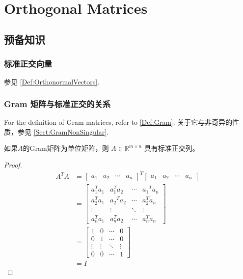 \chapter{Orthogonal Matrices}

\section{预备知识}

\subsection{标准正交向量}

参见 \ref{Def:OrthonormalVectors}.

\subsection{Gram 矩阵与标准正交的关系}

For the definition of Gram matrices, refer to \ref{Def:Gram}. 关于它与非奇异的性质，参见 \ref{Sect:GramNonSingular}.

\begin{theorem}
    如果$A$的Gram矩阵为单位矩阵，则 $ A \in \mathbb{R}^{m \times n} $ 具有标准正交列。
\end{theorem}

\begin{proof}
    \begin{equation} \begin{aligned} A^{T} A&=\left[\begin{array}{llll}a_{1} & a_{2} & \cdots & a_{n}\end{array}\right]^{T}\left[\begin{array}{llll}a_{1} & a_{2} & \cdots & a_{n}\end{array}\right] 
    \\ &=\left[\begin{array}{cccc}a_{1}^{T} a_{1} & a_{1}^{T} a_{2} & \cdots & a_{1}{ }^{T} a_{n} \\ a_{2}^{T} a_{1} & a_{2}{ }^{T} a_{2} & \cdots & a_{2}^{T} a_{n} \\ \vdots & \vdots & \ddots & \vdots \\ a_{n}^{T} a_{1} & a_{n}^{T} a_{2} & \cdots & a_{n}^{T} a_{n}\end{array}\right] 
    \\  &=\left[\begin{array}{cccc}1 & 0 & \cdots & 0 \\ 0 & 1 & \cdots & 0 \\ \vdots & \vdots & \ddots & \vdots \\ 0 & 0 & \cdots & 1\end{array}\right] 
    \\ & =I  \end{aligned} \end{equation}
\end{proof}

